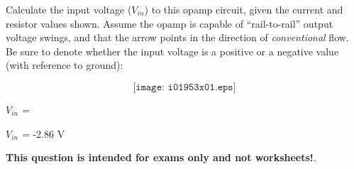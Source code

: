 

Calculate the input voltage ($V_{in}$) to this opamp circuit, given the current and resistor values shown.  Assume the opamp is capable of ``rail-to-rail'' output voltage swings, and that the arrow points in the direction of {\it conventional} flow.  Be sure to denote whether the input voltage is a positive or a negative value (with reference to ground):

$$\texttt{[image: i01953x01.eps]}$$

$V_{in}$ = 







$V_{in}$ = -2.86 V







{\bf This question is intended for exams only and not worksheets!}.


